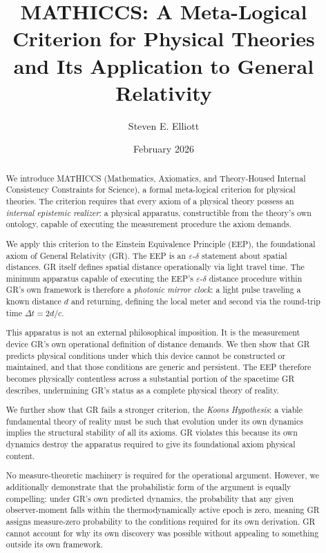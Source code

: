 \documentclass[11pt,a4paper]{article}
\title{MATHICCS: A Meta-Logical Criterion for Physical Theories\\
\large and Its Application to General Relativity}
\author{Steven E. Elliott}
\date{February 2026}
\begin{document}
\maketitle

\begin{abstract}
We introduce MATHICCS (Mathematics, Axiomatics, and Theory-Housed Internal Consistency
Constraints for Science), a formal meta-logical criterion for physical theories. The
criterion requires that every axiom of a physical theory possess an \emph{internal
epistemic realizer}: a physical apparatus, constructible from the theory's own
ontology, capable of executing the measurement procedure the axiom demands.

We apply this criterion to the Einstein Equivalence Principle (EEP), the foundational
axiom of General Relativity (GR). The EEP is an $\varepsilon$-$\delta$ statement about
spatial distances. GR itself defines spatial distance operationally via light travel
time. The minimum apparatus capable of executing the EEP's $\varepsilon$-$\delta$
distance procedure within GR's own framework is therefore a \emph{photonic mirror
clock}: a light pulse traveling a known distance $d$ and returning, defining the local
meter and second via the round-trip time $\Delta t = 2d/c$.

This apparatus is not an external philosophical imposition. It is the measurement
device GR's own operational definition of distance demands. We then show that GR
predicts physical conditions under which this device cannot be constructed or
maintained, and that those conditions are generic and persistent. The EEP therefore
becomes physically contentless across a substantial portion of the spacetime GR
describes, undermining GR's status as a complete physical theory of reality.

We further show that GR fails a stronger criterion, the \emph{Koons Hypothesis}: a
viable fundamental theory of reality must be such that evolution under its own dynamics
implies the structural stability of all its axioms. GR violates this because its own
dynamics destroy the apparatus required to give its foundational axiom physical content.

No measure-theoretic machinery is required for the operational argument. However, we
additionally demonstrate that the probabilistic form of the argument is equally
compelling: under GR's own predicted dynamics, the probability that any given
observer-moment falls within the thermodynamically active epoch is zero, meaning GR
assigns measure-zero probability to the conditions required for its own derivation.
GR cannot account for why its own discovery was possible without appealing to
something outside its own framework.
\end{abstract}
\end{document}
